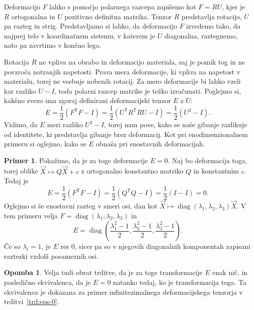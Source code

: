 \documentclass[12pt,a4paper,twoside]{article}
\theoremstyle{definition} %
\newtheorem{primer}[definicija]{Primer}
\newtheorem{opomba}[definicija]{Opomba}
\theoremstyle{plain} %
\numberwithin{equation}{section}
\newcommand{\T}{\mathsf{T}}
\newcommand{\vX}{\vec{X}}
\DeclareMathOperator{\diag}{diag}
\begin{document}
Deformacijo $F$ lahko s pomočjo polarnega razcepa zapišemo kot $F = RU$, kjer je
$R$ ortogonalna in $U$ pozitivno definitna matrika. Tenzor $R$ predstavlja
rotacijo, $U$ pa razteg in strig. Predstavljamo si lahko, da deformacijo $F$
izvedemo tako, da najprej telo v koordinatnem sistemu, v katerem je $U$ diagonalna,
raztegnemo, nato pa zavrtimo v končno lego.

Rotacija $R$ ne vpliva na obrabo in deformacijo materiala, saj je pomik tog in ne povzroča notranjih
napetosti. Prava mera deformacije, ki vpliva na napetost v materialu, torej ne vsebuje nobenih
rotacij. Za mero deformacije bi lahko vzeli kar razliko $U - I$, toda polarni razcep matrike je
težko izračunati. Poglejmo si, kakšno zvezo ima zgoraj definirani deformacijski tenzor $E$ z $U$:
\begin{equation}
   E = \frac12(F^\T F - I) = \frac12(U^\T R^\T R U - I) = \frac12 (U^2 - I).
\end{equation}
Vidimo, da $E$ meri razliko $U^2 - I$, torej nam pove, kako se naše gibanje razlikuje od identitete,
ki predstavlja gibanje brez deformacij. Kot pri enodimenzionalnem primeru si oglejmo, kako
se $E$ obnaša pri enostavnih deformacijah.
\begin{primer}
  Pokažimo, da je za toge deformacije $E = 0$. Naj bo deformacija toga, torej oblike
  $\vX \mapsto Q\vX + c$ z ortogonalno konstantno matriko $Q$ in konstantnim $c$. Tedaj je
  \begin{equation}
     E = \frac12 (F^\T F - I) = \frac12(Q^\T Q - I) = \frac12(I - I) = 0.
  \end{equation}
  Oglejmo si še enostavni razteg v smeri osi, dan kot
  $\vX \mapsto \diag(\lambda_1, \lambda_2, \lambda_3) \vX$.
  V tem primeru velja $F = \diag(\lambda_1, \lambda_2, \lambda_3)$ in
  \begin{equation}
    E = \diag\left(
      \frac{\lambda_1^2-1}{2},
      \frac{\lambda_2^2-1}{2},
      \frac{\lambda_3^2-1}{2}
    \right).
  \end{equation}
  Če so $\lambda_i = 1$, je $E$ res 0, sicer pa so v njegovih diagonalnih
  komponentah zapisani raztezki vzdolž posameznih osi.
\end{primer}
\begin{opomba}
  Velja tudi obrat trditve, da je za toge transformacije $E$ enak nič, in posledično ekvivalenca, da
  je $E = 0$ natanko tedaj, ko je transformacija toga. Ta ekvivalenca je dokazana za primer
  infinitezimalnega deformacijskega tenzorja v trditvi~\ref{trd:eps-0}.
\end{opomba}
\end{document}
